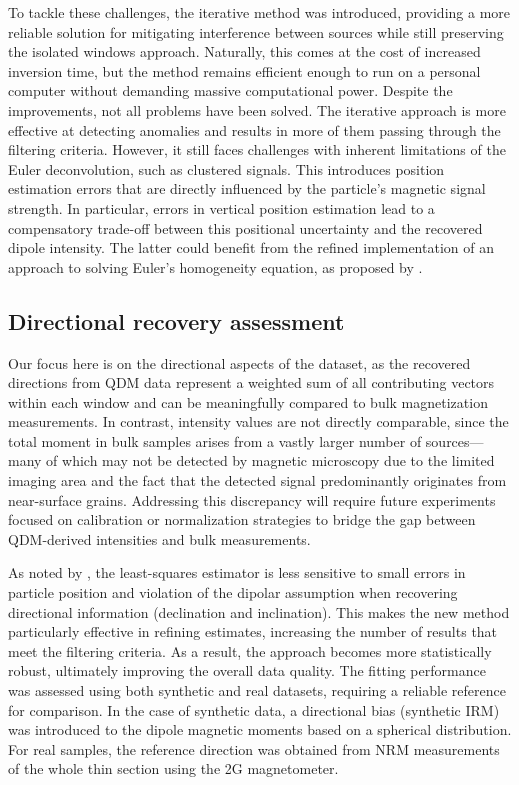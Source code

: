 \documentclass[onecolumn,12pt,a4paper]{article}
\begin{document}
To tackle these challenges, the iterative method was introduced, providing a more reliable solution for mitigating interference between sources while still preserving the isolated windows approach. Naturally, this comes at the cost of increased inversion time, but the method remains efficient enough to run on a personal computer without demanding massive computational power. Despite the improvements, not all problems have been solved. The iterative approach is more effective at detecting anomalies and results in more of them passing through the filtering criteria. However, it still faces challenges with inherent limitations of the Euler deconvolution, such as clustered signals. This introduces position estimation errors that are directly influenced by the particle's magnetic signal strength. In particular, errors in vertical position estimation lead to a compensatory trade-off between this positional uncertainty and the recovered dipole intensity. The latter could benefit from the refined implementation of an approach to solving Euler's homogeneity equation, as proposed by \citet{Uieda2025}.

\subsection{Directional recovery assessment}

Our focus here is on the directional aspects of the dataset, as the recovered directions from QDM data represent a weighted sum of all contributing vectors within each window and can be meaningfully compared to bulk magnetization measurements. In contrast, intensity values are not directly comparable, since the total moment in bulk samples arises from a vastly larger number of sources—many of which may not be detected by magnetic microscopy due to the limited imaging area and the fact that the detected signal predominantly originates from near-surface grains. Addressing this discrepancy will require future experiments focused on calibration or normalization strategies to bridge the gap between QDM-derived intensities and bulk measurements.

As noted by \citet{Oliveira2015Estimation}, the least-squares estimator is less sensitive to small errors in particle position and violation of the dipolar assumption when recovering directional information (declination and inclination). This makes the new method particularly effective in refining estimates, increasing the number of results that meet the filtering criteria. As a result, the approach becomes more statistically robust, ultimately improving the overall data quality. The fitting performance was assessed using both synthetic and real datasets, requiring a reliable reference for comparison. In the case of synthetic data, a directional bias (synthetic IRM) was introduced to the dipole magnetic moments based on a spherical distribution. For real samples, the reference direction was obtained from NRM measurements of the whole thin section using the 2G magnetometer.
\end{document}
